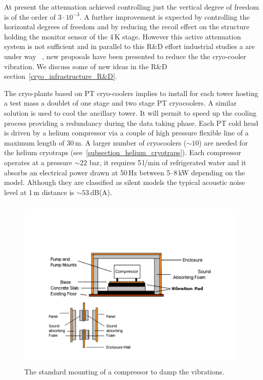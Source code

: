 At present the attenuation achieved controlling just the vertical degree of freedom is of the order of $3 \cdot 10^{-3}$.  A further improvement is expected by controlling the horizontal  degrees of freedom and by reducing the recoil effect on the structure holding the monitor sensor of the 4\,K stage. However this active attenuation system is not sufficient and in parallel to this R\&D effort  industrial studies a are under way~\cite{Riabzev} ,  new proposals  have been presented \cite{Suzuki_2006}  to reduce the  the cryo-cooler vibration. We discuss  some of new ideas in the R\&D section~\ref{cryo_infrastructure_R&D}.

The  cryo-plants based on PT cryo-coolers implies to install for each tower hosting a test mass a doublet of one stage and two stage PT  cryocoolers. A similar solution is used  to cool the ancillary tower. It will permit to speed up the cooling process  providing  a redundancy during the data taking phase. 
Each PT cold head is driven by a  helium compressor via a couple of high pressure flexible line of a maximum length of 30\,m. 
A larger number of cryocoolers ($\sim 10$) are needed for the helium cryotraps (see~\ref{subsection_helium_cryotraps}).
Each compressor  operates at a pressure $\sim 22$ bar, it requires 5\,l/min of refrigerated water and it absorbs an electrical power drawn at 50\,Hz 
between 5--8\,kW depending on the model. Although they are classified as silent models the typical acoustic noise level at 1\,m distance is $\sim 53$\,dB(A).   
\begin{figure}[htbp]
\begin{center}
\includegraphics[width=12cm, height=8.4cm]{./Sec_SiteInfra/Figures/compressor_mounting.pdf}
\caption{{The standard mounting of a compressor to damp the vibrations.}}
\label{fig:compressor_mounting}
\end{center}
\end{figure}
